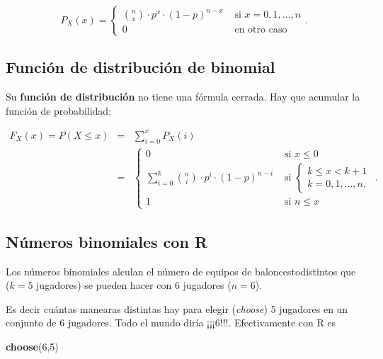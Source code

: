 \documentclass[]{book}
\newenvironment{Shaded}{\begin{snugshade}}{\end{snugshade}}
\newcommand{\DecValTok}[1]{\textcolor[rgb]{0.00,0.00,0.81}{#1}}
\newcommand{\KeywordTok}[1]{\textcolor[rgb]{0.13,0.29,0.53}{\textbf{#1}}}
\newcommand{\NormalTok}[1]{#1}
\begin{document}
\[
P_{X}(x)=\left\{
\begin{array}{ll}
{n\choose x}\cdot  p^x \cdot(1-p)^{n-x} &\mbox{ si } x=0,1,\ldots,n\\
0  & \mbox{ en otro caso}
\end{array}\right..
\]

\hypertarget{funciuxf3n-de-distribuciuxf3n-de-binomial}{%
\subsection{Función de distribución de binomial}\label{funciuxf3n-de-distribuciuxf3n-de-binomial}}

Su \textbf{función de distribución} no tiene una fórmula cerrada. Hay que acumular la función de probabilidad:

\[
\begin{eqnarray*}
F_{X}(x)=P(X\leq x) & = & \sum_{i=0}^x P_X(i)\\
& = & 
\left\{
\begin{array}{ll}
0 & \mbox{ si } x\leq 0\\\displaystyle
\sum_{i=0}^k {n\choose i}\cdot  p^i \cdot (1-p)^{n-i} & \mbox{ si } 
\left\{
  \begin{array}{l} 
  k\leq x< k+1\\
  k=0,1,\ldots,n.
  \end{array}
\right.\\
1 & \mbox{ si } n\leq x
\end{array}
\right..
\end{eqnarray*}
\]

\hypertarget{nuxfameros-binomiales-con-r}{%
\subsection{Números binomiales con R}\label{nuxfameros-binomiales-con-r}}

Los números binomiales alculan el número de equipos de baloncestodistintos que (\(k=5\) jugadores) se pueden hacer con 6 jugadores (\(n=6\)).

Es decir cuántas manearas distintas hay para elegir (\emph{choose}) 5 jugadores en un conjunto de 6 jugadores. Todo el mundo diría
¡¡¡6!!!. Efectivamente con R es

\begin{Shaded}
\begin{Highlighting}[]
\KeywordTok{choose}\NormalTok{(}\DecValTok{6}\NormalTok{,}\DecValTok{5}\NormalTok{)}
\end{Highlighting}
\end{Shaded}
\end{document}

